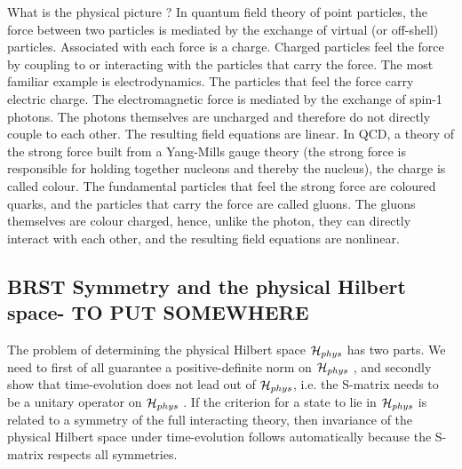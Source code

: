 \begin{mybox}{What is the physical picture ?}
	In quantum field theory of point particles, the force between two particles is mediated by the exchange of virtual (or off-shell) particles. Associated with each force is a charge. Charged particles feel the force by coupling to or interacting with the particles that carry the force. The most familiar example is electrodynamics. The particles that feel the force carry electric charge. The electromagnetic force is mediated by the exchange of spin-1 photons. The photons themselves are uncharged and therefore do not directly couple to each other. The resulting field equations are linear. In QCD, a theory of the strong force built from a Yang-Mills gauge theory (the strong force is responsible for holding together nucleons and thereby the nucleus), the charge is called colour. The fundamental particles that feel the strong force are coloured quarks, and the particles that carry the force are called gluons. The gluons themselves are colour charged, hence, unlike the photon, they can directly interact with each other, and the resulting field equations are nonlinear. 
\end{mybox}
\subsection{BRST Symmetry and the physical Hilbert space- TO PUT SOMEWHERE}
\label{subsec:BRSTYM}
The problem of determining the physical Hilbert space $\mathcal{H}_{phys}$ has two parts. We need to first of all guarantee
a positive-definite norm on $\mathcal{H}_{phys}$ , and secondly show that time-evolution does not lead out of $\mathcal{H}_{phys}$, i.e.
the S-matrix needs to be a unitary operator on $\mathcal{H}_{phys}$ . If the criterion for a state to lie in $\mathcal{H}_{phys}$ is
related to a symmetry of the full interacting theory, then invariance of the physical Hilbert space
under time-evolution follows automatically because the S-matrix respects all symmetries.
